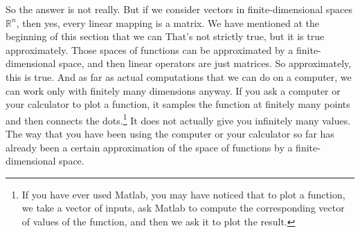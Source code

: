 So the answer is not really.  But if we consider vectors in
finite-dimensional spaces ${\mathbb R}^n$, then yes, every linear mapping is a
matrix.
We have mentioned at the beginning of this section that we can
  That's not strictly true, but
it is true
approximately.  Those  spaces of functions can
be approximated by a finite-dimensional space, and then linear operators
are just matrices.  So approximately, this is true.  And as far as actual
computations that we can do on a computer, we can work only with
finitely many dimensions anyway.  If you ask a computer or your calculator
to plot a function,
it samples the function at finitely many points and then
connects the dots.\footnote{If you have ever used Matlab, you may have
noticed that to plot a function, we take a vector of inputs, ask Matlab
to compute the corresponding vector of values of the function, and then we ask
it to plot the result.}
It does not actually give you infinitely many values.
The way that you have been using the computer or your calculator so far has
already been a certain approximation of the space of functions by a
finite-dimensional space.

\medskip

